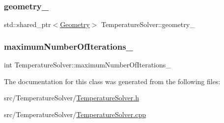 \subsubsection{\texorpdfstring{geometry\_}{geometry\_}}
{\footnotesize\ttfamily std\+::shared\+\_\+ptr$<$\mbox{\hyperlink{classGeometry}{Geometry}}$>$ Temperature\+Solver\+::geometry\+\_\+\hspace{0.3cm}{\ttfamily [protected]}}

\mbox{\label{classTemperatureSolver_ae0bc734676e4237f6c7e9733d90322f2}} 
\subsubsection{\texorpdfstring{maximumNumberOfIterations\_}{maximumNumberOfIterations\_}}
{\footnotesize\ttfamily int Temperature\+Solver\+::maximum\+Number\+Of\+Iterations\+\_\+\hspace{0.3cm}{\ttfamily [protected]}}



The documentation for this class was generated from the following files\+:\begin{DoxyCompactItemize}
\item 
src/\+Temperature\+Solver/\mbox{\hyperlink{TemperatureSolver_8h}{Temperature\+Solver.\+h}}\item 
src/\+Temperature\+Solver/\mbox{\hyperlink{TemperatureSolver_8cpp}{Temperature\+Solver.\+cpp}}\end{DoxyCompactItemize}
